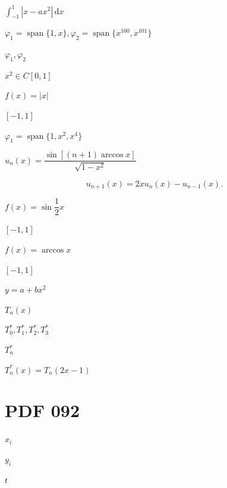 \documentclass[UTF8,fontset=fandol,a4paper]{ctexart}
\begin{document}
\noindent $\displaystyle\int_{-1}^1|x-ax^2|\,\mathrm dx$\par

\noindent $\varphi_1=\operatorname{span}\{1,x\},\varphi_2=\operatorname{span}\{x^{100},x^{101}\}$\par

\noindent $\varphi_1,\varphi_2$\par

\noindent $x^2\in C[0,1]$\par

\noindent $f(x)=|x|$\par

\noindent $[-1,1]$\par

\noindent $\varphi_1=\operatorname{span}\{1,x^2,x^4\}$\par

\noindent $u_n(x)=\dfrac{\sin[(n+1)\arccos x]}{\sqrt{1-x^2}}$\par

\[
u_{n+1}(x)=2xu_n(x)-u_{n-1}(x).
\]

\noindent $f(x)=\sin\dfrac12x$\par

\noindent $[-1,1]$\par

\noindent $f(x)=\arccos x$\par

\noindent $[-1,1]$\par

\noindent $y=a+bx^2$\par

\noindent $T_n(x)$\par

\noindent $T_0^*,T_1^*,T_2^*,T_3^*$\par

\noindent $T_n^*$\par

\noindent $T_n^*(x)=T_n(2x-1)$\par

\section*{PDF 092}

\noindent $x_i$\par

\noindent $y_i$\par

\noindent $t$\par
\end{document}
